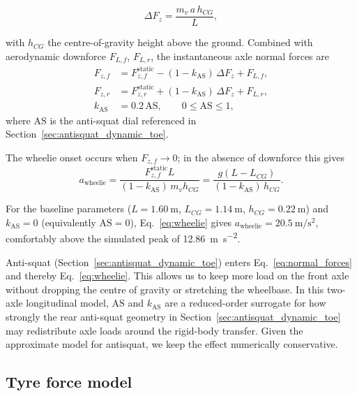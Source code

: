 \documentclass[11pt, a4paper]{report}
\numberwithin{equation}{section}
\begin{document}
\begin{refsection}
\begin{equation}
\Delta F_z = \frac{m_v \, a \, h_{CG}}{L},
\label{eq:load_transfer}
\end{equation}

with $h_{CG}$ the centre-of-gravity height above the ground. Combined
with aerodynamic downforce $F_{L,f}$, $F_{L,r}$, the instantaneous
axle normal forces are
\begin{equation}
\begin{aligned}
F_{z,f} &= F_{z,f}^\text{static} - (1 - k_\text{AS})\,\Delta F_z + F_{L,f},\\
F_{z,r} &= F_{z,r}^\text{static} + (1 - k_\text{AS})\,\Delta F_z + F_{L,r},\\
k_\text{AS} &= 0.2\,\text{AS}, \qquad 0 \le \text{AS} \le 1,
\end{aligned}
\label{eq:normal_forces}
\end{equation}
where $\text{AS}$ is the anti-squat dial referenced in Section~\ref{sec:antisquat_dynamic_toe}.

The wheelie onset occurs when $F_{z,f} \to 0$; in the absence of
downforce this gives
\begin{equation}
a_\text{wheelie} = \frac{F_{z,f}^\text{static} L}{(1 - k_\text{AS})\, m_v h_{CG}}
                 = \frac{g (L - L_{CG})}{(1 - k_\text{AS})\, h_{CG}}.
\label{eq:wheelie}
\end{equation}

For the baseline parameters ($L = \SI{1.60}{\metre}$,
$L_{CG} = \SI{1.14}{\metre}$, $h_{CG} = \SI{0.22}{\metre}$) and
$k_\text{AS}=0$ (equivalently $\text{AS}=0$), Eq.~\ref{eq:wheelie}
gives $a_\text{wheelie} = \SI{20.5}{\metre\per\second\squared}$,
comfortably above the simulated peak of
\SI{12.86}{\metre\per\second\squared}.

Anti-squat (Section~\ref{sec:antisquat_dynamic_toe})
enters Eq.~\ref{eq:normal_forces} and thereby Eq.~\ref{eq:wheelie}.
This allows us to keep more load on the front axle without dropping the centre of gravity or stretching the wheelbase.
In this two-axle longitudinal model, $\text{AS}$ and $k_\text{AS}$ are a reduced-order surrogate for how strongly the rear anti-squat geometry in Section~\ref{sec:antisquat_dynamic_toe} may redistribute axle loads around the rigid-body transfer. Given the approximate model for antisquat, we keep the effect numerically conservative.

\subsection{Tyre force model}
\label{sec:tyre}


\end{refsection}
\end{document}

